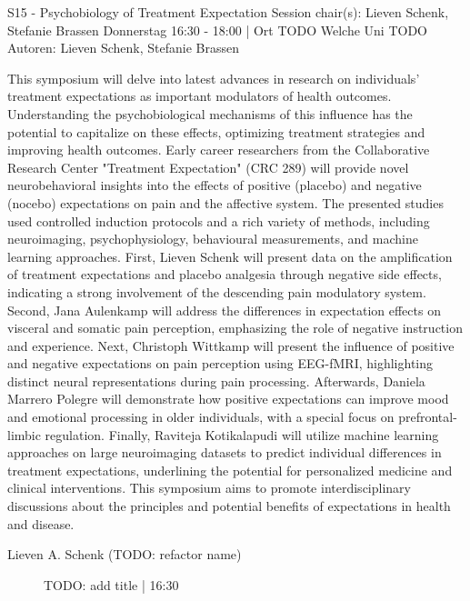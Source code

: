 
            \begin{symposium}
            {S15 - Psychobiology of Treatment Expectation }
            {Session chair(s):  Lieven Schenk, Stefanie Brassen}
            {Donnerstag 16:30 - 18:00 | Ort TODO}
            {Welche Uni TODO}
            Autoren: Lieven Schenk, Stefanie Brassen

This symposium will delve into latest advances in research on individuals’ treatment expectations as important modulators of health outcomes. Understanding the psychobiological mechanisms of this influence has the potential to capitalize on these effects, optimizing treatment strategies and improving health outcomes. Early career researchers from the Collaborative Research Center "Treatment Expectation" (CRC 289) will provide novel neurobehavioral insights into the effects of positive (placebo) and negative (nocebo) expectations on pain and the affective system. The presented studies used controlled induction protocols and a rich variety of methods, including neuroimaging, psychophysiology, behavioural measurements, and machine learning approaches.
First, Lieven Schenk will present data on the amplification of treatment expectations and placebo analgesia through negative side effects, indicating a strong involvement of the descending pain modulatory system. Second, Jana Aulenkamp will address the differences in expectation effects on visceral and somatic pain perception, emphasizing the role of negative instruction and experience. Next, Christoph Wittkamp will present the influence of positive and negative expectations on pain perception using EEG-fMRI, highlighting distinct neural representations during pain processing. Afterwards, Daniela Marrero Polegre will demonstrate how positive expectations can improve mood and emotional processing in older individuals, with a special focus on prefrontal-limbic regulation. Finally, Raviteja Kotikalapudi will utilize machine learning approaches on large neuroimaging datasets to predict individual differences in treatment expectations, underlining the potential for personalized medicine and clinical interventions.
This symposium aims to promote interdisciplinary discussions about the principles and potential benefits of expectations in health and disease.
            \begin{description}    
            
                \item [Lieven A. Schenk (TODO: refactor name)] TODO: add title \textcolor{mygray}{ | 16:30}    
                

\end{description}
\end{symposium}
